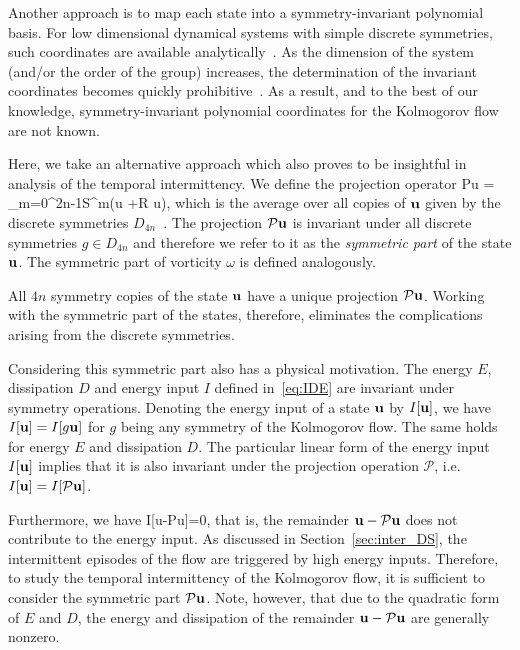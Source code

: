 \documentclass{article}
\begin{document}
Another approach is to map each state into a symmetry-invariant polynomial
basis.
For low dimensional dynamical systems with simple discrete
symmetries, such coordinates are available
analytically~\citep{GL-Gil07b}. As the dimension of the system (and/or the order of the
group) increases, the
determination of the invariant coordinates becomes quickly prohibitive~\citep{SiCvi10}.
As a result, and to the best of our knowledge,
symmetry-invariant polynomial
coordinates for the Kolmogorov flow are not known.

Here, we take an alternative approach which also proves to be insightful in analysis
of the temporal intermittency. We define the projection operator
\beq
\mathcal P\mathbf u = \sum_{m=0}^{2n-1}\mathcal S^m\left(\mathbf u +\mathcal R\mathbf
u\right),
\label{DnA1proj}
\eeq
which is the average over all copies of $\mathbf u$ given by the discrete symmetries
$D_{4n}$~\citep{DasBuch}.
The projection $\mathcal P\mathbf u$ is invariant under all discrete symmetries $g\in D_{4n}$
and therefore we refer to it as the \emph{symmetric part} of the state $\mathbf u$. The symmetric
part of vorticity $\omega$ is defined analogously.

All $4n$ symmetry copies of the state $\mathbf u$ have a unique projection $\mathcal P\mathbf
u$. Working with the symmetric part of the states, therefore, eliminates the complications
arising from the discrete symmetries.

Considering this symmetric part also has a physical
motivation. The energy $E$, dissipation $D$ and energy input $I$ defined in~\eqref{eq:IDE}
are invariant under symmetry operations. Denoting the energy input of a state $\mathbf u$
by $I[\mathbf u]$, we have $I[\mathbf u]=I[g\mathbf u]$ for $g$ being any symmetry of the Kolmogorov flow.
The same holds for energy $E$ and dissipation $D$. The particular linear form of the energy input $I[\mathbf u]$
implies that it is also invariant under the projection operation
$\mathcal P$, i.e. $I[\mathbf u]=I[\mathcal P\mathbf u]$.

Furthermore, we have
\beq
I[\vc u-\mathcal P\vc u]=0,
\label{eq:I_lin}
\eeq
that is, the remainder $\mathbf u-\mathcal P\mathbf u$ does not contribute to the energy input.
As discussed in Section~\ref{sec:inter_DS}, the intermittent episodes of the flow are triggered
by high energy inputs. Therefore, to study the temporal intermittency of the Kolmogorov flow, it is
sufficient to consider the symmetric part $\mathcal P\mathbf u$.
Note, however, that due to the quadratic form of $E$ and $D$,
the energy and dissipation of the remainder $\mathbf u-\mathcal P\mathbf u$
are generally nonzero.
\end{document}
